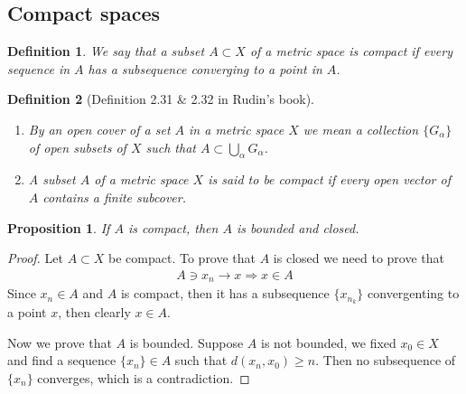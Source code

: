 \documentclass[12pt,leqno]{amsart}
\newtheorem{definition}{Definition}[section]
\newtheorem{proposition}{Proposition}[section]
\theoremstyle{definition}
\numberwithin{equation}{subsection}
\begin{document}
\medskip

\subsection{Compact spaces}
\begin{definition}
We say that a subset $A\subset X$ of a metric space is compact if every sequence in $A$ has a subsequence converging to a point in $A$.
\end{definition}

\begin{definition}[Definition 2.31 \& 2.32 in Rudin's book]
$ $
\begin{enumerate}
    \item By an open cover of a set $A$ in a metric space $X$ we mean a collection $\{G_\alpha\}$ of open subsets of $X$ such that $A\subset \bigcup_\alpha G_\alpha$.
    \item A subset $A$ of a metric space $X$ is said to be compact if every open vector of $A$ contains a finite subcover.
\end{enumerate}
\end{definition}

\begin{proposition}
If $A$ is compact, then $A$ is bounded and closed.
\end{proposition}
\begin{proof}
Let $A\subset X$ be compact. To prove that $A$ is closed we need to prove that 
\begin{align*}
    A\ni x_n\to x \Rightarrow x\in A
\end{align*}
Since $x_n\in A$ and $A$ is compact, then it has a subsequence $\{x_{n_k}\}$ convergenting to a point $x$, then clearly $x\in A$. 

Now we prove that $A$ is bounded. Suppose $A$ is not bounded, we fixed $x_0\in X$ and find a sequence $\{x_n\}\in A$ such that $d(x_n, x_0) \geq n$. Then no subsequence of $\{x_n\}$ converges, which is a contradiction.
\end{proof}
\end{document}

